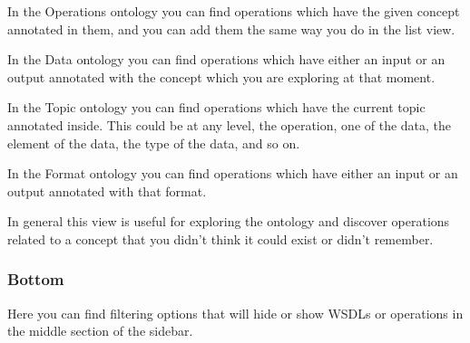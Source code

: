 \documentclass[a4paper,10pt]{article}
\begin{document}
\begin{description}
    In the Operations ontology you can find operations which have the given concept annotated in them, and you can add them the same way you do in the list view.\vspace{3 mm}

    In the Data ontology you can find operations which have either an input or an output annotated with the concept which you are exploring at that moment.\vspace{3 mm}

    In the Topic ontology you can find operations which have the current topic annotated inside. This could be at any level, the operation, one of the data, the element of the data, the type of the data, and so on.\vspace{3 mm}

    In the Format ontology you can find operations which have either an input or an output annotated with that format.\vspace{3 mm}

    In general this view is useful for exploring the ontology and discover operations related to a concept that you didn't think it could exist or didn't remember.\vspace{3 mm}
    \end{description}

    \subsubsection{Bottom}

    Here you can find filtering options that will hide or show WSDLs or operations in the middle section of the sidebar.
\end{document}
